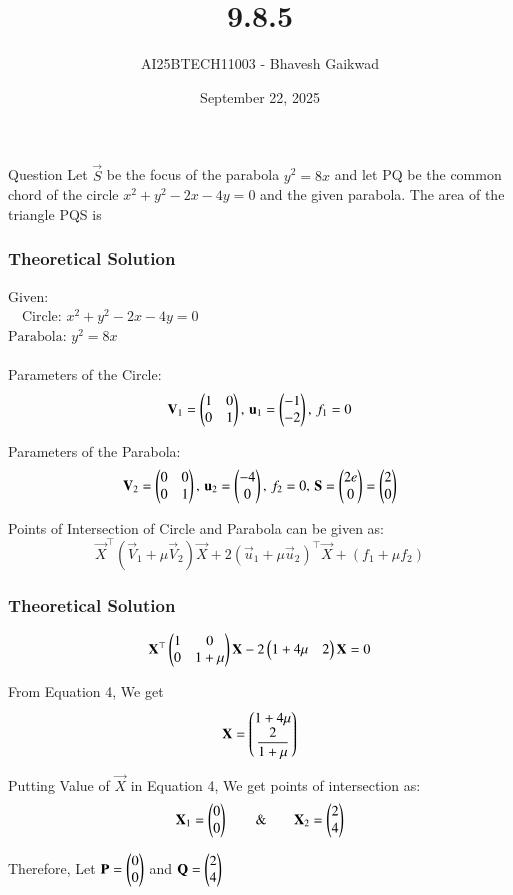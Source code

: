 \documentclass{beamer}
\title
{9.8.5}
\date{September 22, 2025}
\author 
{AI25BTECH11003 - Bhavesh Gaikwad}
\begin{document}
\frame{\titlepage}
\begin{frame}{Question}
Let $\vec{S}$ be the focus of the parabola $y^2 = 8x$ and let PQ be the common chord of the circle $x^2 + y^2 - 2x - 4y = 0$ and the given parabola. The area of the triangle PQS is
\end{frame}


\begin{frame}[fragile]
    \frametitle{Theoretical Solution}
     $\text{Given: }$\\
$\quad \text{Circle: }x^2 + y^2 - 2x - 4y = 0$\\
$\text{Parabola: }y^2 = 8x$\\\\


Parameters of the Circle:
\begin{equation}
\mathbf{V}_1 = \begin{pmatrix}1 & 0 \\ 0 & 1\end{pmatrix}, \, \mathbf{u}_1 = \begin{pmatrix}-1 \\ -2\end{pmatrix}, \, f_1 = 0   
\end{equation}

Parameters of the Parabola:
\begin{equation}
\mathbf{V}_2 = \begin{pmatrix}0 & 0 \\ 0 & 1\end{pmatrix}, \, \mathbf{u}_2 = \begin{pmatrix}-4 \\ 0\end{pmatrix}, \, f_2 = 0, \, \mathbf{S} = \begin{pmatrix}2e \\ 0 \end{pmatrix} = \begin{pmatrix}2 \\ 0\end{pmatrix}   
\end{equation}

Points of Intersection of Circle and Parabola can be given as:
\begin{equation}
\vec{X}^\top(\vec{V}_1+\mu\vec{V}_2)\vec{X} + 2(\vec{u}_1+\mu\vec{u}_2)^\top\vec{X} + (f_1 + \mu f_2)    
\end{equation}
\end{frame}


\begin{frame}[fragile]
    \frametitle{Theoretical Solution}
 \begin{equation}
\mathbf{X}^\top\begin{pmatrix}1 & 0 \\ 0 & 1+\mu\end{pmatrix}\mathbf{X} - 2\begin{pmatrix}1+4\mu & 2\end{pmatrix}\mathbf{X} = 0    
\end{equation}

From Equation 4, We get
\begin{equation}
    \mathbf{X}=\begin{pmatrix}1+4\mu \\ \dfrac{2}{1+\mu}\end{pmatrix}
\end{equation}

Putting Value of $\vec{X}$ in Equation 4, We get points of intersection as:
\begin{equation}
    \mathbf{X}_1 = \begin{pmatrix}0 \\ 0\end{pmatrix} \qquad \& \qquad \mathbf{X}_2 = \begin{pmatrix}2 \\ 4\end{pmatrix}
\end{equation}

Therefore,
Let $\mathbf{P} = \begin{pmatrix}0 \\ 0\end{pmatrix}$ and $\mathbf{Q} = \begin{pmatrix}2 \\ 4\end{pmatrix}$\\\\
\end{frame}
\end{document}
